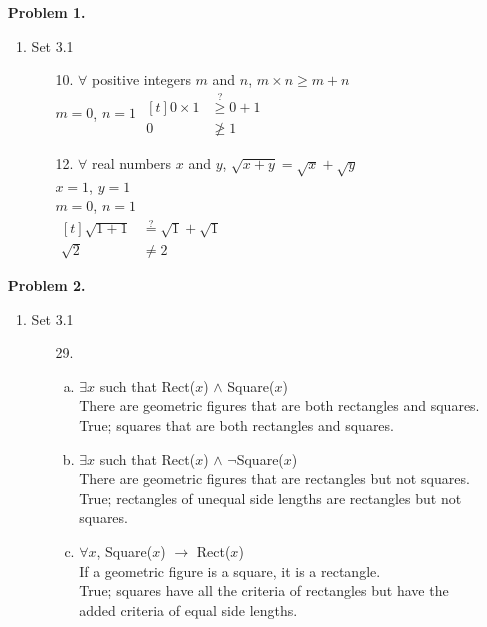 \documentclass[letterpaper,fleqn]{article}
\begin{document}
	\begin{enumerate} 
		\item [] \textbf{Problem 1.}
		\begin{enumerate}[]
			\item Set 3.1
			\begin{enumerate}
				\item [10.]
				$\forall$ positive integers $m$ and $n$, $m \times n \geq m + n$ \\
				$m=0$, $n=1$
				$\begin{aligned}[t]
					0 \times 1 & \stackrel{?}{\geq} 0 + 1 \\
					0 & \not\geq 1
				\end{aligned}$
				
				\item [12.]
				$\forall$ real numbers $x$ and $y$, $\sqrt{x+y} = \sqrt{x}+\sqrt{y}$ \\
				$x=1$, $y=1$ \\
				$m=0$, $n=1$ \\
				$\begin{aligned}[t]
					\sqrt{1+1} & \stackrel{?}{=} \sqrt{1}+\sqrt{1} \\
					\sqrt{2} & \not= 2
				\end{aligned}$
				
			\end{enumerate}
		\end{enumerate}
		
		\item [] \textbf{Problem 2.}
		\begin{enumerate}[]
			\item Set 3.1
			\begin{enumerate}
				\item [29.] \quad
				\begin{enumerate}[(a)]
					\item
					$\exists x$ such that Rect($x$) $\wedge$ Square($x$) \\
					There are geometric figures that are both rectangles and squares. \\
					True; squares that are both rectangles and squares.
					\item
					$\exists x$ such that Rect($x$) $\wedge$ $\neg$Square($x$) \\ 
					There are geometric figures that are rectangles but not squares. \\
					True; rectangles of unequal side lengths are rectangles but not squares.
					\item
					$\forall x$, Square($x$) $\rightarrow$ Rect($x$) \\
					If a geometric figure is a square, it is a rectangle. \\
					True; squares have all the criteria of rectangles but have the added criteria of equal side lengths.
				\end{enumerate}
			\end{enumerate}
		\end{enumerate}
		

\end{enumerate}
\end{document}
